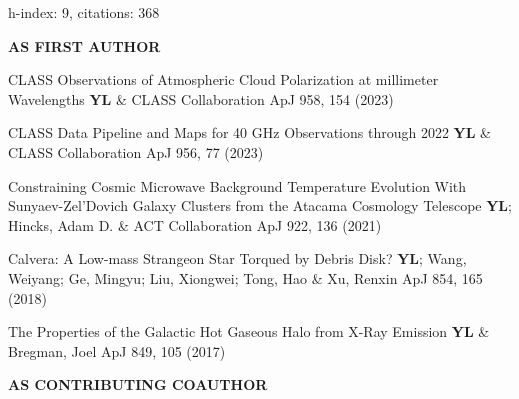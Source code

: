 \hfill\textmd{h-index: 9, citations: 368}
\begin{footnotesize}
    \textsf{\textbf{ AS FIRST AUTHOR }}
\end{footnotesize}
\begin{etaremune}[topsep=0pt,itemsep=0pt,partopsep=0pt,parsep=0pt]
    \renewcommand\labelenumi{\footnotesize\bfseries\theenumi.}
    
            {CLASS Observations of Atmospheric Cloud Polarization at millimeter Wavelengths}
            {\textbf{YL} \& CLASS Collaboration}
            {ApJ 958, 154 (2023)}
    
            {CLASS Data Pipeline and Maps for 40 GHz Observations through 2022}
            {\textbf{YL} \& CLASS Collaboration}
            {ApJ 956, 77 (2023)}
    
            {Constraining Cosmic Microwave Background Temperature Evolution With Sunyaev-Zel'Dovich Galaxy Clusters from the Atacama Cosmology Telescope}
            {\textbf{YL}; Hincks, Adam D. \& ACT Collaboration}
            {ApJ 922, 136 (2021)}
    
            {Calvera: A Low-mass Strangeon Star Torqued by Debris Disk?}
            {\textbf{YL}; Wang, Weiyang; Ge, Mingyu; Liu, Xiongwei; Tong, Hao \& Xu, Renxin}
            {ApJ 854, 165 (2018)}
    
            {The Properties of the Galactic Hot Gaseous Halo from X-Ray Emission}
            {\textbf{YL} \& Bregman, Joel}
            {ApJ 849, 105 (2017)}
    
\end{etaremune}
\begin{footnotesize}
    \textsf{\textbf{ AS CONTRIBUTING COAUTHOR }}
\end{footnotesize}
